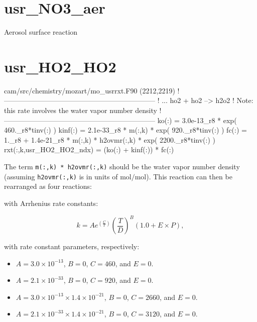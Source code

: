 \documentclass[titlepage]{article}
\begin{document}

\section{usr\_NO3\_aer}

Aerosol surface reaction


\section{usr\_HO2\_HO2}

\begin{blockcode}[commandchars=\\\{\}]
\color{gray}cam/src/chemistry/mozart/mo_usrrxt.F90 (2212,2219)
!-----------------------------------------------------------------
! ... ho2 + ho2 --> h2o2
! Note: this rate involves the water vapor number density
!-----------------------------------------------------------------
         ko(:)   = 3.0e-13_r8  * exp( 460._r8*tinv(:) )
         kinf(:) = 2.1e-33_r8 * m(:,k) * exp( 920._r8*tinv(:) )
         fc(:)   = 1._r8 + 1.4e-21_r8 * m(:,k) * h2ovmr(:,k) * exp( 2200._r8*tinv(:) )
         rxt(:,k,usr_HO2_HO2_ndx) = (ko(:) + kinf(:)) * fc(:)
\end{blockcode}

The term \verb>m(:,k) * h2ovmr(:,k)> should be the water vapor number density (assuming \verb>h2ovmr(:,k)> is in units of $\mbox{mol}/\mbox{mol}$). This reaction can then be rearranged as four reactions:
\vspace{20px}






\vspace{20px}

\noindent with Arrhenius rate constants:

\begin{equation}
k = Ae^{(\frac{C}{T})}(\frac{T}{D})^B(1.0+E \times P),
\end{equation}

\noindent with rate constant parameters, respectively:

\begin{itemize}
\item $A = 3.0 \times 10^{-13}$, $B = 0$, $C = 460$, and $E = 0$.
\item $A = 2.1 \times 10^{-33}$, $B = 0$, $C = 920$, and $E = 0$.
\item $A = 3.0 \times 10^{-13} \times 1.4 \times 10^{-21}$, $B = 0$, $C = 2660$, and $E = 0$.
\item $A = 2.1 \times 10^{-33} \times 1.4 \times 10^{-21}$, $B = 0$, $C = 3120$, and $E = 0$.
\end{itemize}
\end{document}

